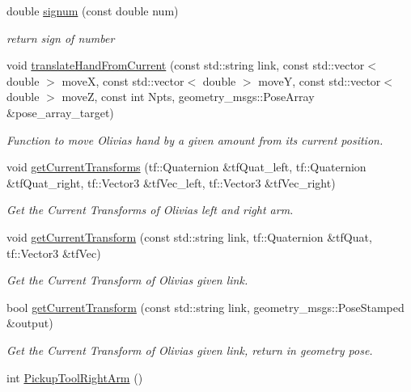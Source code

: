 \begin{DoxyCompactItemize}
double \hyperlink{structManipulate_a423d2c284a0ecab7089b36908e5e871a}{signum} (const double num)
\begin{DoxyCompactList}\small\item\em return sign of number \end{DoxyCompactList}\item 
void \hyperlink{structManipulate_ad07aa34d6fcf28db6068e114acc0357b}{translate\+Hand\+From\+Current} (const std\+::string link, const std\+::vector$<$ double $>$ moveX, const std\+::vector$<$ double $>$ moveY, const std\+::vector$<$ double $>$ moveZ, const int Npts, geometry\+\_\+msgs\+::\+Pose\+Array \&pose\+\_\+array\+\_\+target)
\begin{DoxyCompactList}\small\item\em Function to move Olivia\textquotesingle{}s hand by a given amount from it\textquotesingle{}s current position. \end{DoxyCompactList}\item 
void \hyperlink{structManipulate_a2a7bcfd0f83e32f0c1e98eeef3de195b}{get\+Current\+Transforms} (tf\+::\+Quaternion \&tf\+Quat\+\_\+left, tf\+::\+Quaternion \&tf\+Quat\+\_\+right, tf\+::\+Vector3 \&tf\+Vec\+\_\+left, tf\+::\+Vector3 \&tf\+Vec\+\_\+right)
\begin{DoxyCompactList}\small\item\em Get the Current Transforms of Olivia\textquotesingle{}s left and right arm. \end{DoxyCompactList}\item 
void \hyperlink{structManipulate_ac2b42e79d4785602c5e32e6f34db0745}{get\+Current\+Transform} (const std\+::string link, tf\+::\+Quaternion \&tf\+Quat, tf\+::\+Vector3 \&tf\+Vec)
\begin{DoxyCompactList}\small\item\em Get the Current Transform of Olivia\textquotesingle{}s given link. \end{DoxyCompactList}\item 
bool \hyperlink{structManipulate_a1409babf135ae08e5957a325b2c64432}{get\+Current\+Transform} (const std\+::string link, geometry\+\_\+msgs\+::\+Pose\+Stamped \&output)
\begin{DoxyCompactList}\small\item\em Get the Current Transform of Olivia\textquotesingle{}s given link, return in geometry pose. \end{DoxyCompactList}\item 
int \hyperlink{structManipulate_a21c87a257e786f4ab336d26074770283}{Pickup\+Tool\+Right\+Arm} ()

\end{DoxyCompactItemize}
